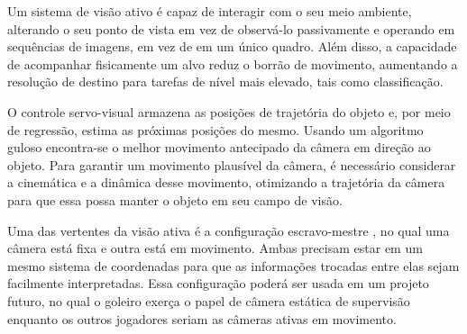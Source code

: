 Um sistema de visão ativo é capaz de interagir com o seu meio ambiente, alterando o seu ponto de vista em vez de observá-lo passivamente e operando em sequências de imagens, em vez de em um único quadro. Além disso, a capacidade de acompanhar fisicamente um alvo reduz o borrão de movimento, aumentando a resolução de destino para tarefas de nível mais elevado, tais como classificação. 

O controle servo-visual armazena as posições de trajetória do objeto e, por meio de regressão, estima as próximas posições do mesmo.  	Usando um algoritmo guloso encontra-se o melhor movimento antecipado da câmera em direção ao objeto. Para garantir um movimento plausível da câmera, é necessário considerar a cinemática e a dinâmica desse movimento, otimizando a trajetória da câmera para que essa possa manter o objeto em seu campo de visão.

Uma das vertentes da visão ativa é a configuração escravo-mestre \cite[p.2]{Fernandez}, no qual uma câmera está fixa e outra está em movimento. Ambas precisam estar em um mesmo sistema de coordenadas para que as informações trocadas entre elas sejam facilmente interpretadas. Essa configuração poderá ser usada em um projeto futuro, no qual o goleiro exerça o papel de câmera estática de supervisão enquanto os outros jogadores seriam as câmeras ativas em movimento. 

